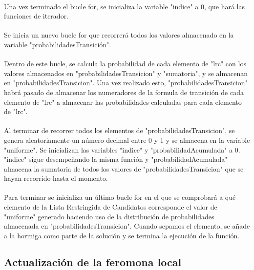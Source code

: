 	\paragraph{}Una vez terminado el bucle for, se inicializa la variable "indice" a 0, que hará las funciones de iterador.
	
	\paragraph{}Se inicia un nuevo bucle for que recorrerá todos los valores almacenado en la variable "probabilidadesTransición".
	
	\paragraph{}Dentro de este bucle, se calcula la probabilidad de cada elemento de "lrc" con los valores almacenados en "probabilidadesTransicion" y "sumatoria", y se almacenan en "probabilidadesTransicion". Una vez realizado esto, "probabilidadesTransicion" habrá pasado de almacenar los numeradores de la formula de transición de cada elemento de "lrc" a almacenar las probabilidades calculadas para cada elemento de "lrc".
	
	\paragraph{}Al terminar de recorrer todos los elementos de "probabilidadesTransicion", se genera aleatoriamente un número decimal entre 0 y 1 y se almacena en la variable "uniforme". Se inicializan las variables "indice" y "probabilidadAcumulada" a 0. "indice" sigue desempeñando la misma función y "probabilidadAcumulada" almacena la sumatoria de todos los valores de "probabilidadesTransicion" que se hayan recorrido hasta el momento.
	
	\paragraph{}Para terminar se inicializa un último bucle for en el que se comprobará a qué elemento de la Lista Restringida de Candidatos corresponde el valor de "uniforme" generado haciendo uso de la distribución de probabilidades almacenada en "probabilidadesTransicion". Cuando sepamos el elemento, se añade a la hormiga como parte de la solución y se termina la ejecución de la función.
	
	\subsection{Actualización de la feromona local}
	
